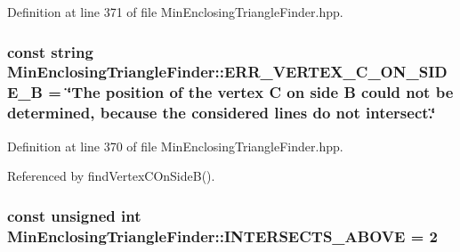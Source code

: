 \-Definition at line 371 of file \-Min\-Enclosing\-Triangle\-Finder.\-hpp.

\hypertarget{classmultiscale_1_1MinEnclosingTriangleFinder_a8e551d77bc36b7696ea969823f5720d1}{
\subsubsection[{\-E\-R\-R\-\_\-\-V\-E\-R\-T\-E\-X\-\_\-\-C\-\_\-\-O\-N\-\_\-\-S\-I\-D\-E\-\_\-\-B}]{\setlength{\rightskip}{0pt plus 5cm}const string {\bf \-Min\-Enclosing\-Triangle\-Finder\-::\-E\-R\-R\-\_\-\-V\-E\-R\-T\-E\-X\-\_\-\-C\-\_\-\-O\-N\-\_\-\-S\-I\-D\-E\-\_\-\-B} = \char`\"{}\-The position of the vertex \-C on side \-B could not be determined, because the considered lines do not intersect.\char`\"{}}}\label{classmultiscale_1_1MinEnclosingTriangleFinder_a8e551d77bc36b7696ea969823f5720d1}


\-Definition at line 370 of file \-Min\-Enclosing\-Triangle\-Finder.\-hpp.



\-Referenced by find\-Vertex\-C\-On\-Side\-B().

\hypertarget{classmultiscale_1_1MinEnclosingTriangleFinder_ab44440be62a75f528ccc11753ce66b52}{
\subsubsection[{\-I\-N\-T\-E\-R\-S\-E\-C\-T\-S\-\_\-\-A\-B\-O\-V\-E}]{\setlength{\rightskip}{0pt plus 5cm}const unsigned int {\bf \-Min\-Enclosing\-Triangle\-Finder\-::\-I\-N\-T\-E\-R\-S\-E\-C\-T\-S\-\_\-\-A\-B\-O\-V\-E} = 2}}\label{classmultiscale_1_1MinEnclosingTriangleFinder_ab44440be62a75f528ccc11753ce66b52}


